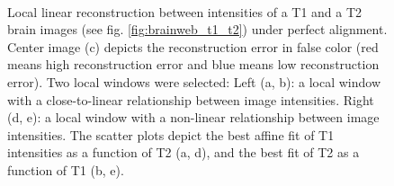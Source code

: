 \begin{figure}[t!]
\centering
    \\
    \caption{Local linear reconstruction between intensities of a T1 and a T2 brain images (see fig. \ref{fig:brainweb_t1_t2}) under perfect alignment. Center image (c) depicts the reconstruction error in false color (red means high reconstruction error and blue means low reconstruction error). Two local windows were selected: Left (a, b): a local window with a close-to-linear relationship between image intensities. Right (d, e): a local window with a non-linear relationship between image intensities. The scatter plots depict the best affine fit of T1 intensities as a function of T2 (a, d), and the best fit of T2 as a function of T1 (b, e).}
\label{fig:llr_test}
\end{figure}





